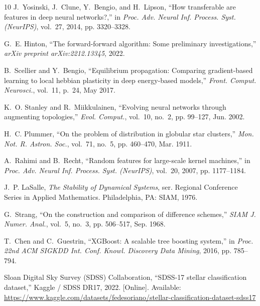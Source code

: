 \documentclass[journal]{IEEEtran}
\begin{document}
\begin{thebibliography}{10}
J.~Yosinski, J.~Clune, Y.~Bengio, and H.~Lipson, ``How transferable are features in deep neural networks?,'' in \emph{Proc. Adv. Neural Inf. Process. Syst. (NeurIPS)}, vol.~27, 2014, pp. 3320--3328.

G.~E. Hinton, ``The forward-forward algorithm: Some preliminary investigations,'' \emph{arXiv preprint arXiv:2212.13345}, 2022.

B.~Scellier and Y.~Bengio, ``Equilibrium propagation: Comparing gradient-based learning to local hebbian plasticity in deep energy-based models,'' \emph{Front. Comput. Neurosci.}, vol.~11, p.~24, May 2017.

K.~O. Stanley and R.~Miikkulainen, ``Evolving neural networks through augmenting topologies,'' \emph{Evol. Comput.}, vol.~10, no.~2, pp. 99--127, Jun. 2002.

H.~C. Plummer, ``On the problem of distribution in globular star clusters,'' \emph{Mon. Not. R. Astron. Soc.}, vol.~71, no.~5, pp. 460--470, Mar. 1911.

A.~Rahimi and B.~Recht, ``Random features for large-scale kernel machines,'' in \emph{Proc. Adv. Neural Inf. Process. Syst. (NeurIPS)}, vol.~20, 2007, pp. 1177--1184.

J.~P. LaSalle, \emph{The Stability of Dynamical Systems}, ser. Regional Conference Series in Applied Mathematics. Philadelphia, PA: SIAM, 1976.

G.~Strang, ``On the construction and comparison of difference schemes,'' \emph{SIAM J. Numer. Anal.}, vol.~5, no.~3, pp. 506--517, Sep. 1968.

T.~Chen and C.~Guestrin, ``XGBoost: A scalable tree boosting system,'' in \emph{Proc. 22nd ACM SIGKDD Int. Conf. Knowl. Discovery Data Mining}, 2016, pp. 785--794.

Sloan Digital Sky Survey (SDSS) Collaboration, ``SDSS-17 stellar classification dataset,'' Kaggle / SDSS DR17, 2022. [Online]. Available: \url{https://www.kaggle.com/datasets/fedesoriano/stellar-classification-dataset-sdss17}
\end{thebibliography}
\end{document}
